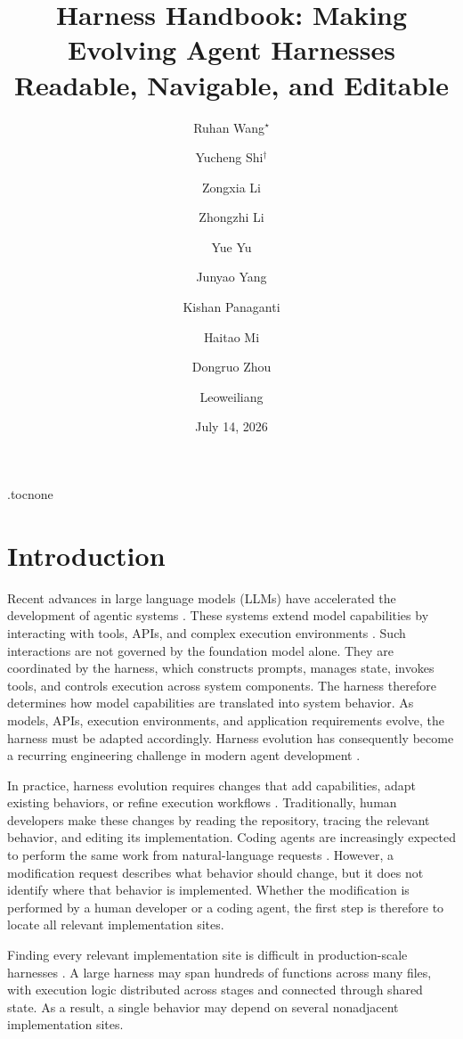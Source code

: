 \documentclass[]{ailab}
\title{Harness Handbook: Making Evolving Agent Harnesses Readable, Navigable, and Editable}
\author[1,2]{Ruhan Wang$^\star$}
\author[1]{Yucheng Shi$^\dagger$ }
\author[1,3]{Zongxia Li}
\author[1,4]{Zhongzhi Li}
\author[2]{Yue Yu}
\author[1,5]{Junyao Yang}
\author[1]{Kishan Panaganti}
\author[1]{Haitao Mi}
\author[2]{Dongruo Zhou}
\author[1]{Leoweiliang}
\affiliation[1]{Tencent HY LLM Frontier}
\affiliation[2]{Indiana University}
\affiliation[3]{University of Maryland, College Park}
\affiliation[4]{University of Georgia}
\affiliation[5]{National University of Singapore}
\date{July 14, 2026}
\begin{document}
\thispagestyle{firstheader}
\maketitle

\etocsettocdepth.toc{none}
\section{Introduction}

Recent advances in large language models (LLMs) have accelerated the development
of agentic systems \citep{wang2024survey,yao2022react,huang2025towards}. These
systems extend model capabilities by interacting with tools, APIs, and complex
execution environments
\citep{schick2023toolformer,zhou2024webarena,xie2024osworld,yang2024swe}. Such
interactions are not governed by the foundation model alone. They are coordinated
by the harness, which constructs prompts, manages state, invokes tools, and
controls execution across system components. The harness therefore determines
how model capabilities are translated into system behavior. As models, APIs,
execution environments, and application requirements evolve, the harness must be
adapted accordingly. Harness evolution has consequently become a recurring
engineering challenge in modern agent development
\citep{lin2026agentic,lopopolo2026harness,zhong2026ai}.

In practice, harness evolution requires changes that add capabilities, adapt
existing behaviors, or refine execution workflows
\citep{wang2025federated,wang2026fera}. Traditionally, human developers make
these changes by reading the repository, tracing the relevant behavior, and
editing its implementation. Coding agents are increasingly expected to perform
the same work from natural-language requests
\citep{yang2024swe,wang2025openhands,zhong2026ai,zhu2026semaclaw}. However, a
modification request describes what behavior should change, but it does not
identify where that behavior is implemented. Whether the modification is
performed by a human developer or a coding agent, the first step is therefore to
locate all relevant implementation sites.

Finding every relevant implementation site is difficult in production-scale
harnesses \citep{ning2026code}. A large harness may span hundreds of functions
across many files, with execution logic distributed across stages and connected
through shared state. As a result, a single behavior may depend on several
nonadjacent implementation sites.
\end{document}

